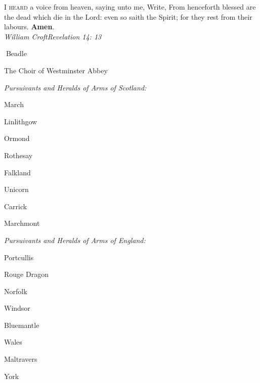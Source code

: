 \color{black}\normalfont \lettrine[lines=2,loversize=.2]{I}{ 
heard} a voice from heaven, saying unto me, Write, From henceforth blessed are
the dead which die in the Lord: even so saith the Spirit; for they rest from their
labours. \textbf{Amen}.\\\itshape\color{qred}
William Croft\hfill Revelation 14: 13

\begin{center}\normalfont\color{black}
	
Beadle

The Choir of Westminster Abbey




{\itshape\color{qred}Pursuivants and Heralds of Arms of Scotland:}

\begin{minipage}[t]{0.35\textwidth}\begin{center}
March

Linlithgow

Ormond

Rothesay\end{center}\end{minipage}\begin{minipage}[t]{0.35\textwidth}\begin{center}
Falkland 

Unicorn 

Carrick 

Marchmont	
\end{center}\end{minipage}

{\itshape\color{qred}Pursuivants and Heralds of Arms of England:}
\begin{minipage}[t]{0.35\textwidth}\begin{center}
Portcullis 

Rouge Dragon 

Norfolk

Windsor\end{center}\end{minipage}%
\begin{minipage}[t]{0.35\textwidth}\begin{center}

Bluemantle 

Wales


 Maltravers	
 
 York\end{center}
\end{minipage}


\end{center}
